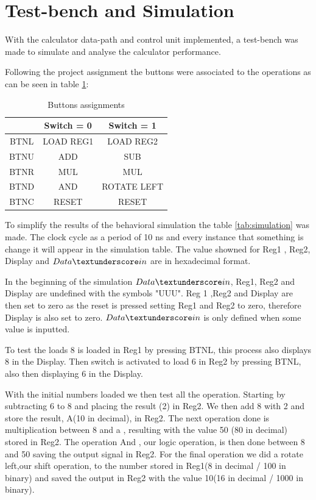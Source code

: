 \documentclass[12pt]{article}
\begin{document}
\section{Test-bench and Simulation}
With the calculator data-path and control unit implemented, a test-bench was made to simulate and analyse the calculator performance. 

Following the project assignment the buttons were associated to the operations as  can be seen in table \ref{BUTTONS}:

\begin{table}[H]
	\centering
	\begin{tabular}{|c|c|c|}
        \hline
		    & Switch = 0 & Switch = 1\\
      \hline
		  BTNL  & LOAD REG1 & LOAD REG2 \\
    \hline
		BTNU    & ADD & SUB\\
    \hline
		BTNR    & MUL & MUL \\
    \hline
		BTND   & AND & ROTATE LEFT\\
    \hline
        BTNC   & RESET & RESET \\
        \hline
		
	\end{tabular}
	\caption{Buttons assignments}
	\label{BUTTONS}
\end{table}

To simplify the results of the behavioral simulation the table \ref{tab:simulation} was made. The clock cycle as a period of 10 ns and every instance that something is change it will appear in the simulation table. The value showned for Reg1 , Reg2, Display and $Data\textunderscore in$ are in hexadecimal format.

In the beginning of the simulation $Data\textunderscore in$, Reg1, Reg2 and Display are undefined with the symbols "UUU". Reg 1 ,Reg2 and Display are then set to zero as the reset is pressed setting Reg1 and Reg2 to zero, therefore Display is also set to zero. $Data\textunderscore in$ is only defined when some value is inputted. 

To test the loads 8 is loaded in Reg1 by pressing BTNL, this process also displays 8 in the Display. Then switch is activated to load 6 in Reg2 by pressing BTNL, also then displaying 6 in the Display.

With the initial numbers loaded we then test all the operation. Starting by subtracting 6 to 8 and placing the result (2) in Reg2. We then add 8 with 2 and store the result, A(10 in decimal), in Reg2. The next operation done is multiplication between 8 and a , resulting with the value 50 (80 in decimal) stored in Reg2. The operation And , our logic operation, is then done between 8 and 50 saving the output signal in Reg2. For the final operation we did a rotate left,our shift operation, to the number stored in Reg1(8 in decimal / 100 in binary) and saved the output in Reg2 with the value 10(16 in decimal / 1000 in binary). 
\end{document}
